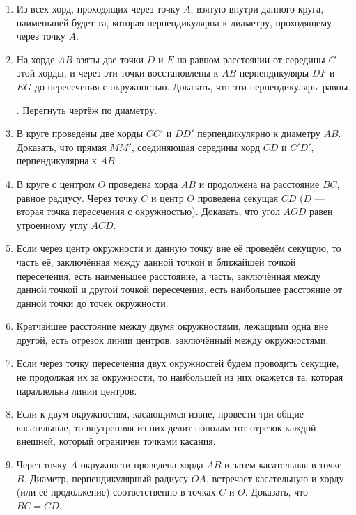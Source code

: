\documentclass[twoside]{book}
\begin{document}
\begin{enumerate}[resume]


 \item
Из всех хорд, проходящих через точку $A$, взятую внутри данного круга, наименьшей будет та, которая перпендикулярна к диаметру, проходящему через точку $A$.

 \item
На хорде $AB$ взяты две точки $D$ и $E$ на равном расстоянии от середины $C$ этой хорды, и через эти точки восстановлены к $AB$ перпендикуляры $DF$ и $EG$ до пересечения с окружностью.
Доказать, что эти перпендикуляры равны.

\smallskip
{}.
Перегнуть чертёж по диаметру.

 \item
В круге проведены две хорды $CC'$ и $DD'$ перпендикулярно к диаметру $AB$.
Доказать, что прямая $MM'$, соединяющая середины хорд $CD$ и $C'D'$, перпендикулярна к $AB$.

 \item
В круге с центром $O$ проведена хорда $AB$ и продолжена на расстояние $BC$, равное радиусу.
Через точку $C$ и центр $O$ проведена секущая $CD$ ($D$ — вторая точка пересечения с окружностью).
Доказать, что угол $AOD$ равен утроенному углу $ACD$.

 \item
Если через центр окружности и данную точку вне её проведём секущую, то часть её, заключённая между данной точкой и ближайшей точкой пересечения, есть наименьшее расстояние, а часть, заключённая между данной точкой и другой точкой пересечения, есть наибольшее расстояние от данной точки до точек окружности.

 \item
Кратчайшее расстояние между двумя окружностями, лежащими одна вне другой, есть отрезок линии центров, заключённый между окружностями.

 \item
Если через точку пересечения двух окружностей будем проводить секущие, не продолжая их за окружности, то наибольшей из них окажется та, которая параллельна линии центров.

 \item
Если к двум окружностям, касающимся извне, провести три общие касательные, то внутренняя из них делит пополам тот отрезок каждой внешней, который ограничен точками касания.

 \item
Через точку $A$ окружности проведена хорда $AB$ и затем касательная в точке $B$.
Диаметр, перпендикулярный радиусу $OA$, встречает касательную и хорду (или её продолжение) соответственно в точках $C$ и $O$.
Доказать, что $BC=CD$.


\end{enumerate}
\end{document}
